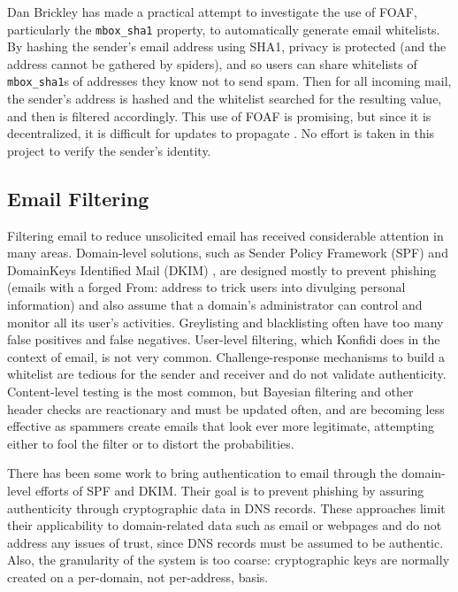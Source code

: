 \documentclass[letterpaper]{www2006-submission}
\begin{document}
Dan Brickley has made a practical attempt to investigate the use of FOAF, particularly the \texttt{mbox\_sha1} property, to automatically generate email whitelists. By hashing the sender's email address using SHA1, privacy is protected (and the address cannot be gathered by spiders), and so users can share whitelists of \texttt{mbox\_sha1}s of addresses they know not to send spam. Then for all incoming mail, the sender's address is hashed and the whitelist searched for the resulting value, and then is filtered accordingly. This use of FOAF is promising, but since it is decentralized, it is difficult for updates to propagate \citep{foafWhitelisting}. No effort is taken in this project to verify the sender's identity.

\subsection{Email Filtering}
Filtering email to reduce unsolicited email has received considerable attention in many areas.  Domain-level solutions, such as Sender Policy Framework (SPF) \citep{spf} and DomainKeys Identified Mail (DKIM) \citep{dkim}, are designed mostly to prevent phishing (emails with a forged From: address to trick users into divulging personal information) and also assume that a domain's administrator can control and monitor all its user's activities. Greylisting and blacklisting often have too many false positives and false negatives. User-level filtering, which Konfidi does in the context of email, is not very common. Challenge-response mechanisms to build a whitelist are tedious for the sender and receiver and do not validate authenticity. Content-level testing is the most common, but Bayesian filtering and other header checks are reactionary and must be updated often, and are becoming less effective as spammers create emails that look ever more legitimate, attempting either to fool the filter or to distort the probabilities.

There has been some work to bring authentication to email through the domain-level efforts of SPF and DKIM.  Their goal is to prevent phishing by assuring authenticity through cryptographic data in DNS records.  These approaches limit their applicability to domain-related data such as email or webpages and do not address any issues of trust, since DNS records must be assumed to be authentic.  Also, the granularity of the system is too coarse: cryptographic keys are normally created on a per-domain, not per-address, basis.
\end{document}
